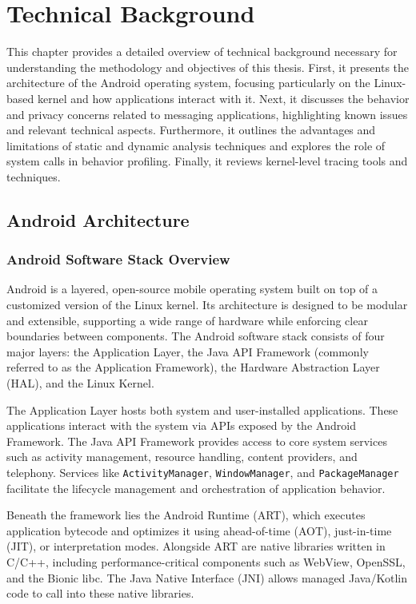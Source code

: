 \documentclass[a4paper,12pt]{report}
\begin{document}

\chapter{Technical Background}

This chapter provides a detailed overview of technical background necessary for understanding the methodology and objectives of this thesis. First, it presents the architecture of the Android operating system, focusing particularly on the Linux-based kernel and how applications interact with it. Next, it discusses the behavior and privacy concerns related to messaging applications, highlighting known issues and relevant technical aspects. Furthermore, it outlines the advantages and limitations of static and dynamic analysis techniques and explores the role of system calls in behavior profiling. Finally, it reviews kernel-level tracing tools and techniques.
\section{Android Architecture}

\subsection{Android Software Stack Overview}
Android is a layered, open-source mobile operating system built on top of a customized version of the
Linux kernel. Its architecture is designed to be modular and extensible, supporting a wide range of
hardware while enforcing clear boundaries between components. The Android software stack consists
of four major layers: the Application Layer, the Java API Framework (commonly referred to as the
Application Framework), the Hardware Abstraction Layer (HAL), and the Linux Kernel.

The Application Layer hosts both system and user-installed applications.
These applications interact with the system via APIs exposed by the Android Framework.
The Java API Framework provides access to core system services such as activity management,
resource handling, content providers, and telephony. Services like \texttt{ActivityManager},
\texttt{WindowManager}, and \texttt{PackageManager} facilitate the lifecycle management and
orchestration of application behavior.

Beneath the framework lies the Android Runtime (ART), which executes application bytecode and optimizes it using ahead-of-time (AOT), just-in-time (JIT), or interpretation modes. Alongside ART are native libraries written in C/C++, including performance-critical components such as WebView, OpenSSL, and the Bionic libc. The Java Native Interface (JNI) allows managed Java/Kotlin code to call into these native libraries.
\end{document}
